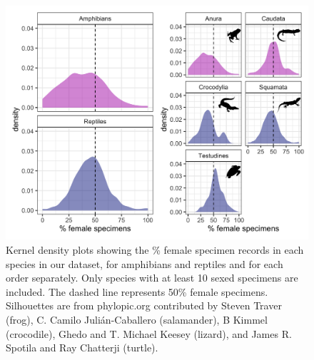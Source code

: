 \documentclass[a4paper, 12pt]{article}
\begin{document}
\newpage
\begin{figure}[h]
 \centering
  \includegraphics[width = \linewidth]{figures/class-order-density.png}
  \caption{Kernel density plots showing the \% female specimen records in each species in our dataset, for amphibians and reptiles and for each order separately. Only species with at least 10 sexed specimens are included. The dashed line represents 50\% female specimens. Silhouettes are from phylopic.org contributed by Steven Traver (frog), C. Camilo Julián-Caballero (salamander), B Kimmel (crocodile), Ghedo and T. Michael Keesey (lizard), and James R. Spotila and Ray Chatterji (turtle).}
  \label{fig-females}
\end{figure}
\end{document}
